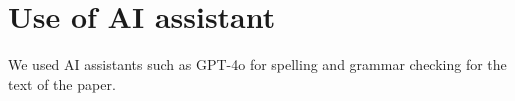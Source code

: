 \section{Use of AI assistant}
\label{sec:use_of_ai_assistant}
We used AI assistants such as GPT-4o for spelling and grammar checking for the text of the paper.

\newpage



